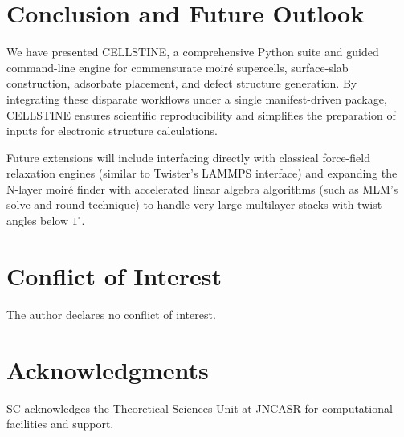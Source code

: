 \documentclass[9pt,a4paper,twoside]{tau-class/tau}
\begin{document}
\section{Conclusion and Future Outlook}
\label{sec:conclusion}
We have presented CELLSTINE, a comprehensive Python suite and guided command-line engine for commensurate moir\'e supercells, surface-slab construction, adsorbate placement, and defect structure generation. By integrating these disparate workflows under a single manifest-driven package, CELLSTINE ensures scientific reproducibility and simplifies the preparation of inputs for electronic structure calculations. 

Future extensions will include interfacing directly with classical force-field relaxation engines (similar to Twister's LAMMPS interface) and expanding the N-layer moir\'e finder with accelerated linear algebra algorithms (such as MLM's solve-and-round technique) to handle very large multilayer stacks with twist angles below $1^\circ$.

\section*{Conflict of Interest}
The author declares no conflict of interest.

\section*{Acknowledgments}
SC acknowledges the Theoretical Sciences Unit at JNCASR for computational facilities and support.

\printbibliography
\end{document}
